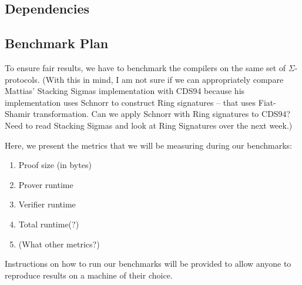 \subsection{Dependencies}
\label{sec:dependencies}

\subsection{Benchmark Plan}
\label{sec:benchmarks}
To ensure fair results, we have to benchmark the compilers on the same set of $\Sigma$-protocols. (With this in mind, I am not sure if we can appropriately compare Mattias' Stacking Sigmas implementation with CDS94 because his implementation uses Schnorr to construct Ring signatures -- that uses Fiat-Shamir transformation. Can we apply Schnorr with Ring signatures to CDS94? Need to read Stacking Sigmas and look at Ring Signatures over the next week.) 

Here, we present the metrics that we will be measuring during our benchmarks:
\begin{enumerate}
    \item Proof size (in bytes)
    \item Prover runtime
    \item Verifier runtime
    \item Total runtime(?)
    \item (What other metrics?)
\end{enumerate}

Instructions on how to run our benchmarks will be provided to allow anyone to reproduce results on a machine of their choice.